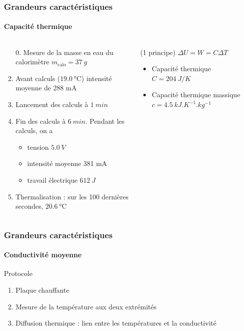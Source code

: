 \documentclass[a4paper,11pt]{beamer}
\newcommand{\cel}{\degreeCelsius}
\begin{document}
\begin{frame}
    \frametitle{Grandeurs caractéristiques}
    \framesubtitle{Capacité thermique}

    \begin{columns}
        \begin{column}{0.55\textwidth}
            \begin{enumerate}
                \item[0.] Mesure de la masse en eau du calorimètre $m_\text{calo} = \SI{37}{g}$
                \item Avant calculs ($\SI{19,0}{\cel}$) intensité moyenne de 288 mA
                \item Lancement des calculs à $\SI{1}{min}$
                \item Fin des calculs à $\SI{6}{min}$. Pendant les calculs, on a
                \begin{itemize}
                    \item tension $\SI{5,0}{V}$
                    \item intensité moyenne 381 mA
                    \item travail électrique $\SI{612}{J}$
                \end{itemize}
                \item Thermalisation : sur les 100 dernières secondes, $\SI{20,6}{\cel}$
            \end{enumerate}
        \end{column}
        \vrule{}
        \begin{column}{0.45\textwidth}
            (1\ier{} principe) $\Delta U = W = C \Delta T$
            \begin{itemize}
                \item Capacité thermique $C = \SI{204}{J/K}$
                \item Capacité thermique massique $c = \SI{4,5}{kJ.K^{-1}.kg^{-1}}$
            \end{itemize}
        \end{column}
    \end{columns}
\end{frame}

\begin{frame}
    \frametitle{Grandeurs caractéristiques}
    \framesubtitle{Conductivité moyenne}

    Protocole
    \begin{enumerate}
        \item Plaque chauffante
        \item Mesure de la température aux deux extrémités
        \item Diffusion thermique : lien entre les températures et la conductivité
    \end{enumerate}
\end{frame}
\end{document}
